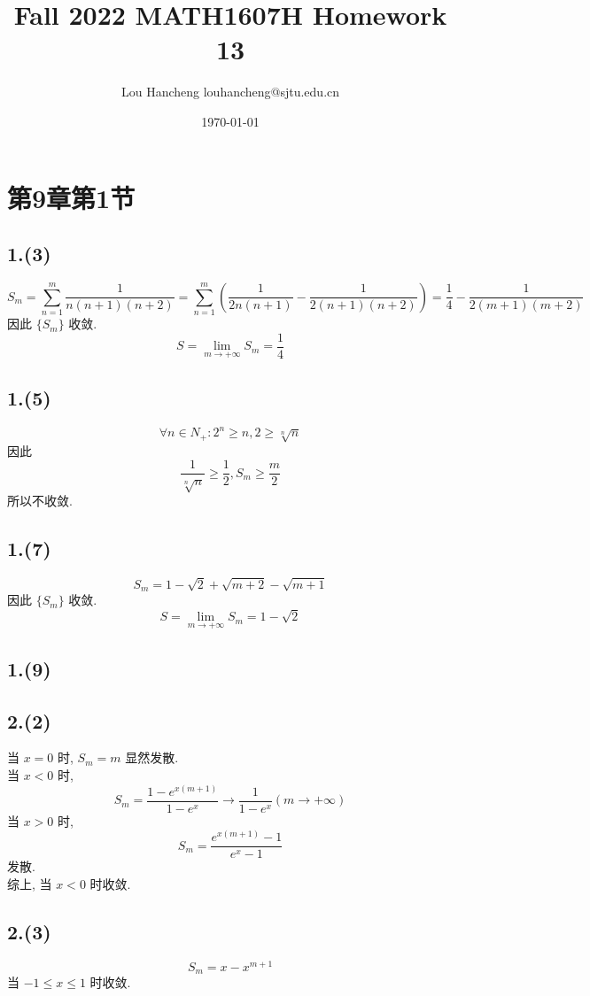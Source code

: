 \documentclass[12pt, a4paper, oneside]{ctexart}
\title{Fall 2022 MATH1607H Homework 13}
\author{Lou Hancheng \quad louhancheng@sjtu.edu.cn}
\date{\today}
\begin{document}
    \maketitle
    \section*{第9章第1节}
        \subsection*{1.(3)}
            $$
                S_m=\sum_{n=1}^{m}\frac{1}{n(n+1)(n+2)}=\sum_{n=1}^{m}(\frac{1}{2n(n+1)}-\frac{1}{2(n+1)(n+2)})=\frac14-\frac{1}{2(m+1)(m+2)}
            $$
            因此 $\{S_m\}$ 收敛.
            $$
                S=\lim_{m\to+\infty}S_m=\frac14
            $$
        \subsection*{1.(5)}
            $$
                \forall n \in N_+:2^n\geq n,2\geq \sqrt[n]{n}
            $$
            因此
            $$
                \frac{1}{\sqrt[n]{n}}\geq \frac12,S_m\geq\frac{m}{2}
            $$
            所以不收敛.
        \subsection*{1.(7)}
            $$
                S_m=1-\sqrt2+\sqrt{m+2}-\sqrt{m+1}
            $$
            因此 $\{S_m\}$ 收敛.
            $$
                S=\lim_{m\to+\infty}S_m=1-\sqrt2
            $$
        \subsection*{1.(9)}
        \subsection*{2.(2)}
            当 $x=0$ 时, $S_m=m$ 显然发散.\\
            当 $x<0$ 时,
            $$
                S_m=\frac{1-e^{x(m+1)}}{1-e^x}\to \frac{1}{1-e^x}(m\to+\infty)
            $$
            当 $x>0$ 时,
            $$
                S_m=\frac{e^{x(m+1)}-1}{e^x-1}
            $$
            发散.\\
            综上, 当 $x<0$ 时收敛.
        \subsection*{2.(3)}
            $$
                S_m=x-x^{m+1}
            $$
            当 $-1\leq x\leq 1$ 时收敛.
\end{document}
